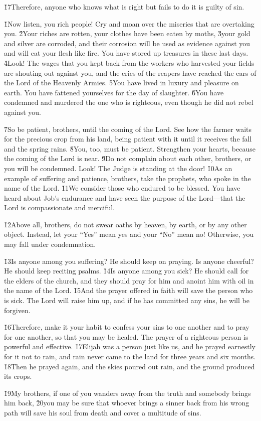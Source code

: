\v{17}Therefore, anyone who knows what is right but fails to do it is guilty of sin.

\v{1}Now listen, you rich people! Cry and moan over the miseries that are overtaking you. \v{2}Your riches are rotten, your clothes have been eaten by moths, \v{3}your gold and silver are corroded, and their corrosion will be used as evidence against you and will eat your flesh like fire. You have stored up treasures in these last days. \v{4}Look! The wages that you kept back from the workers who harvested your fields are shouting out against you, and the cries of the reapers have reached the ears of the Lord of the Heavenly Armies. \v{5}You have lived in luxury and pleasure on earth. You have fattened yourselves for the day of slaughter. \v{6}You have condemned and murdered the one who is righteous, even though he did not rebel against you.

\v{7}So be patient, brothers, until the coming of the Lord. See how the farmer waits for the precious crop from his land, being patient with it until it receives the fall and the spring rains. \v{8}You, too, must be patient. Strengthen your hearts, because the coming of the Lord is near. \v{9}Do not complain about each other, brothers, or you will be condemned. Look! The Judge is standing at the door! \v{10}As an example of suffering and patience, brothers, take the prophets, who spoke in the name of the Lord. \v{11}We consider those who endured to be blessed. You have heard about Job's endurance and have seen the purpose of the Lord---that the Lord is compassionate and merciful.

\v{12}Above all, brothers, do not swear oaths by heaven, by earth, or by any other object. Instead, let your ``Yes'' mean yes and your ``No'' mean no! Otherwise, you may fall under condemnation.

\v{13}Is anyone among you suffering? He should keep on praying. Is anyone cheerful? He should keep reciting psalms. \v{14}Is anyone among you sick? He should call for the elders of the church, and they should pray for him and anoint him with oil in the name of the Lord. \v{15}And the prayer offered in faith will save the person who is sick. The Lord will raise him up, and if he has committed any sins, he will be forgiven.

\v{16}Therefore, make it your habit to confess your sins to one another and to pray for one another, so that you may be healed. The prayer of a righteous person is powerful and effective. \v{17}Elijah was a person just like us, and he prayed earnestly for it not to rain, and rain never came to the land for three years and six months. \v{18}Then he prayed again, and the skies poured out rain, and the ground produced its crops.

\v{19}My brothers, if one of you wanders away from the truth and somebody brings him back, \v{20}you may be sure that whoever brings a sinner back from his wrong path will save his soul from death and cover a multitude of sins.
